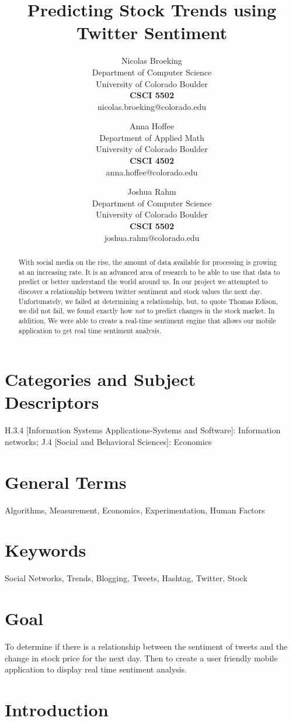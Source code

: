 \documentclass{acm_proc_article-sp}
\title{Predicting Stock Trends using Twitter Sentiment}
\author{
    Nicolas Broeking \\
    \small Department of Computer Science \\
    \small University of Colorado Boulder \\
    \small \textbf{CSCI 5502} \\
    \small nicolas.broeking@colorado.edu \\
    \and
    Anna Hoffee \\
    \small Department of Applied Math \\
    \small University of Colorado Boulder \\
    \small \textbf{CSCI 4502} \\
    \small anna.hoffee@colorado.edu \\
    \and
    Joshua Rahm \\
    \small Department of Computer Science \\
    \small University of Colorado Boulder \\
    \small \textbf{CSCI 5502} \\
    \small joshua.rahm@colorado.edu \\
}
\begin{document}
\nocite{*}


\begin{abstract} 

With social media on the rise, the amount of data available for processing is
growing at an increasing rate. It is an advanced area of research to be able to
use that data to predict or better understand the world around us. In our
project we attempted to discover a relationship between twitter sentiment and
stock values the next day. Unfortunately, we failed at determining a
relationship, but, to quote Thomas Edison, we did not fail, we found exactly how \emph{not}
to predict changes in the stock market. In addition, We were able to create a real-time
sentiment engine that allows our mobile application to get real time sentiment
analysis.

\end{abstract}

\section*{Categories and Subject\\ Descriptors}

H.3.4 [Information Systems Applications-Systems and Software]: Information
networks; J.4 [Social and Behavioral Sciences]: Economics

\section*{General Terms}
Algorithms, Measurement, Economics, Experimentation, Human Factors

\section*{Keywords}

Social Networks, Trends, Blogging, Tweets, Hashtag, Twitter, Stock

\section*{Goal}

To determine if there is a relationship between the sentiment of tweets and the
change in stock price for the next day. Then to create a user friendly mobile
application to display real time sentiment analysis.

\section{Introduction}
\end{document}
